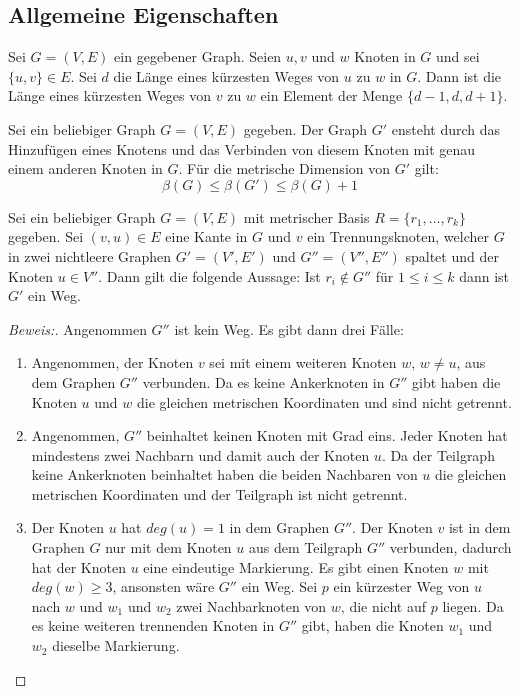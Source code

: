 \subsection{Allgemeine Eigenschaften}
\begin{lem}\cite{landmarks}
\label{dist}
Sei $G=(V,E)$ ein gegebener Graph. Seien $u,v$ und $w$ Knoten in $G$ und sei $\{u,v\}\in E$. Sei $d$ die Länge eines kürzesten Weges von $u$ zu $w$ in $G$. Dann ist die Länge eines kürzesten Weges von $v$ zu $w$ ein Element der Menge $\{d-1,d,d+1\}$.
\end{lem}
\begin{lem}
\cite{kdimbases}
\label{einelementreichtnicht}
Sei ein beliebiger Graph $G=(V,E)$ gegeben. Der Graph $G'$ ensteht durch das Hinzufügen eines Knotens und das Verbinden von diesem Knoten mit genau einem anderen Knoten in $G$. Für die metrische Dimension von $G'$ gilt:
$$\beta(G)\leq \beta(G')\leq \beta(G)+1$$ 
\end{lem}
\begin{lem}
\label{wegtrennungsknoten}
\label{first_theorem}
Sei ein beliebiger Graph $G=(V,E)$ mit metrischer Basis $R=\{r_1, \ldots, r_k\}$ gegeben. Sei $(v,u) \in E$ eine Kante in $G$ und $v$ ein Trennungsknoten, welcher $G$ in zwei nichtleere Graphen $G'=(V',E')$ und $G''=(V'',E'')$ spaltet und der Knoten $u \in V''$. Dann gilt die folgende Aussage:\newline
Ist $r_i \notin G''$ für $1 \leq i \leq k$ dann ist $G'$ ein Weg.
\end{lem}
\begin{proof}[Beweis:]
Angenommen $G''$ ist kein Weg. Es gibt dann drei Fälle:
\begin{enumerate}
\item Angenommen, der Knoten $v$ sei mit einem weiteren Knoten $w$, $w \neq u$, aus dem Graphen $G''$ verbunden. Da es keine Ankerknoten in $G''$ gibt haben die Knoten $u$ und $w$ die gleichen metrischen Koordinaten und sind nicht getrennt.
\item Angenommen, $G''$ beinhaltet keinen Knoten mit Grad eins. Jeder Knoten hat mindestens zwei Nachbarn und damit auch der Knoten $u$. Da der Teilgraph keine Ankerknoten beinhaltet haben die beiden Nachbaren von $u$ die gleichen metrischen Koordinaten und der Teilgraph ist nicht getrennt.
\item Der Knoten $u$ hat $deg(u)=1$ in dem Graphen $G''$. Der Knoten $v$ ist in dem Graphen $G$ nur mit dem Knoten $u$ aus dem Teilgraph $G''$ verbunden, dadurch hat der Knoten $u$ eine eindeutige Markierung. Es gibt einen Knoten $w$ mit $deg(w) \geq 3$, ansonsten wäre $G''$ ein Weg. Sei $p$ ein kürzester Weg von $u$ nach $w$ und $w_1$ und $w_2$ zwei Nachbarknoten von $w$, die nicht auf $p$ liegen. Da es keine weiteren trennenden Knoten in $G''$ gibt, haben die Knoten $w_1$ und $w_2$ dieselbe Markierung.   
\end{enumerate}
\end{proof}
